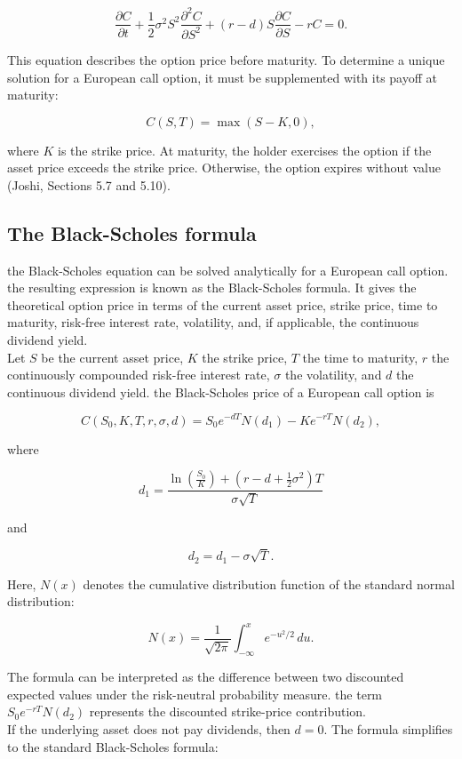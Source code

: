 \documentclass{article}
\begin{document}
	\[
	\boxed{
		\frac{\partial C}{\partial t}
		+\frac{1}{2}\sigma^2S^2
		\frac{\partial^2 C}{\partial S^2}
		+(r-d)S\frac{\partial C}{\partial S}
		-rC=0.
	}
	\]
	
	This equation describes the option price before maturity. To determine a unique solution for a European call option, it must be supplemented with its payoff at maturity:
	
	\[
	C(S, T)=\max(S-K, 0),
	\]
	
	where $K$ is the strike price. At maturity, the holder exercises the option if the asset price exceeds the strike price. Otherwise, the option expires without value (Joshi, Sections 5.7 and 5.10).
	
	\subsection{The Black-Scholes formula}
	
	the Black-Scholes equation can be solved analytically for a European call option. the resulting expression is known as the Black-Scholes formula. It gives the theoretical option price in terms of the current asset price, strike price, time to maturity, risk-free interest rate, volatility, and, if applicable, the continuous dividend yield.\\
	Let $S$ be the current asset price, $K$ the strike price, $T$ the time to maturity, $r$ the continuously compounded risk-free interest rate, $\sigma$ the volatility, and $d$ the continuous dividend yield. the Black-Scholes price of a European call option is
	
	\[
	\boxed{
		C(S_0,K,T,r,\sigma,d)
		=
		S_0e^{-dT}N(d_1)
		-Ke^{-rT}N(d_2),
	}
	\]
	
	where
	
	\[
	d_1=
	\frac{
		\ln\left(\frac{S_0}{K}\right)
		+\left(r-d+\frac{1}{2}\sigma^2\right)T
	}{
		\sigma\sqrt{T}
	}
	\]
	
	and
	
	\[
	d_2=d_1-\sigma\sqrt{T}.
	\]
	
	Here, $N(x)$ denotes the cumulative distribution function of the standard normal distribution:
	
	\[
	N(x)=\frac{1}{\sqrt{2\pi}}
	\int_{-\infty}^{x}e^{-u^2/2}\,du.
	\]
	
	The formula can be interpreted as the difference between two discounted expected values under the risk-neutral probability measure. the term $S_0e^{-rT}N(d_2)$ represents the discounted strike-price contribution.\\
	If the underlying asset does not pay dividends, then $d = 0$. The formula simplifies to the standard Black-Scholes formula:
	
\end{document}
